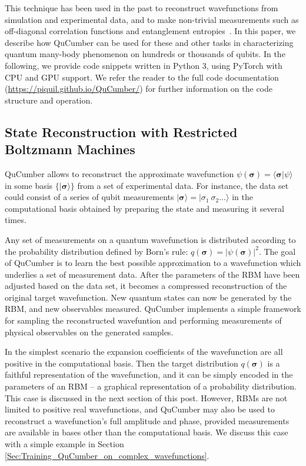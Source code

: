 \documentclass[submission, Phys]{SciPost}
\begin{document}
This technique has been used in the past to reconstruct wavefunctions from simulation and experimental data, 
and to make non-trivial measurements such as off-diagonal correlation functions and entanglement entropies~\cite{Torlai2016thermo, torlai2018tomography}.
In this paper, we describe how QuCumber can be used for these and other tasks in characterizing quantum many-body phenomenon on hundreds or thousands of qubits.
In the following, we provide code snippets written in Python 3, using PyTorch with CPU and GPU support.
We refer the reader to the full code documentation (\url{https://piquil.github.io/QuCumber/}) for further information on the code structure and operation.


\subsection{State Reconstruction with Restricted Boltzmann Machines}

QuCumber allows to reconstruct the approximate wavefunction $\psi( \boldsymbol{\sigma} )  = \langle  \boldsymbol{\sigma} | \psi \rangle$ 
in some basis $\{ \vert \boldsymbol{ \sigma} \rangle \}$ from a set of experimental data.
For instance, the data set could consist of a series of qubit measurements 
$\vert {\boldsymbol{ \sigma}} \rangle = \vert { \sigma}_1~{ \sigma}_2 \dots \rangle$ 
in the computational basis obtained by preparing the state and measuring it several times.

Any set of measurements on a quantum wavefunction is distributed according to the probability distribution defined by Born's rule: 
$q(\boldsymbol{\sigma}) = | \psi( \boldsymbol{\sigma} ) |^2$.
The goal of QuCumber is to learn the best possible approximation to a wavefunction which underlies a set of measurement data.
After the parameters of the RBM have been adjusted based on the data set, it becomes a compressed reconstruction of the original target wavefunction. 
New quantum states can now be generated by the RBM, and new observables measured. 
QuCumber implements a simple framework for sampling the reconstructed wavefuntion 
and performing measurements of physical observables on the generated samples.

In the simplest scenario the expansion coefficients of the wavefunction are all positive in the computational basis.  
Then the target distribution $q(\boldsymbol{\sigma})$ is a faithful representation of the wavefunction, 
and it can be simply encoded in the parameters of an RBM -- a graphical representation of a probability distribution. 
This case is discussed in the next section of this post. However, RBMs are not limited to positive real wavefunctions, 
and QuCumber may also be used to reconstruct a wavefunction's full amplitude and phase, provided measurements are available in bases other than the computational basis. 
We discuss this case with a simple example in Section \ref{Sec:Training_QuCumber_on_complex_wavefunctions}.
\end{document}
